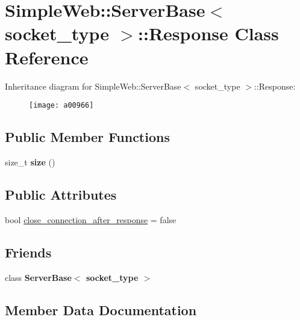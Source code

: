 \hypertarget{a00966}{}\section{Simple\+Web\+:\+:Server\+Base$<$ socket\+\_\+type $>$\+:\+:Response Class Reference}
\label{a00966}
Inheritance diagram for Simple\+Web\+:\+:Server\+Base$<$ socket\+\_\+type $>$\+:\+:Response\+:\begin{figure}[H]
\begin{center}
\leavevmode
\texttt{[image: a00966]}
\end{center}
\end{figure}
\subsection*{Public Member Functions}
\begin{DoxyCompactItemize}
\item 
\mbox{\label{a00966_af666efb61621d70c16e3d6a6c419271d}} 
size\+\_\+t {\bfseries size} ()
\end{DoxyCompactItemize}
\subsection*{Public Attributes}
\begin{DoxyCompactItemize}
\item 
bool \hyperlink{a00966_a2818b4f3c577ff1f4067bb1c62640c15}{close\+\_\+connection\+\_\+after\+\_\+response} = false
\end{DoxyCompactItemize}
\subsection*{Friends}
\begin{DoxyCompactItemize}
\item 
\mbox{\label{a00966_a01d54a7e16ca437c98ec571deca98dfc}} 
class {\bfseries Server\+Base$<$ socket\+\_\+type $>$}
\end{DoxyCompactItemize}


\subsection{Member Data Documentation}
\mbox{\label{a00966_a2818b4f3c577ff1f4067bb1c62640c15}} 
